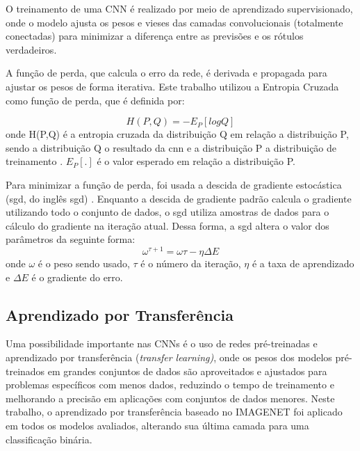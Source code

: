 O treinamento de uma CNN é realizado por meio de aprendizado supervisionado, onde o modelo ajusta os pesos e vieses das camadas convolucionais (totalmente conectadas) para minimizar a diferença entre as previsões e os rótulos verdadeiros.

A função de perda, que calcula o erro da rede, é derivada e propagada para ajustar os pesos de forma iterativa. 
Este trabalho utilizou a Entropia Cruzada como função de perda, que é definida por:

\begin{equation}
    \label{eqn:crossentropy}
    H(P,Q) = -E_{P}[log Q]
\end{equation}
onde H(P,Q) é a entropia cruzada da distribuição Q em relação a distribuição P, sendo a distribuição Q o resultado da \acrshort{cnn} e a distribuição P a distribuição de treinamento \cite{mao2023}. 
$E_{P}[.]$ é o valor esperado em relação a distribuição P.

Para minimizar a função de perda, foi usada a descida de gradiente estocástica (\acrshort{sgd}, do inglês \acrlong{sgd}) \cite{ruder2016}. Enquanto a descida de gradiente padrão calcula o gradiente utilizando todo o conjunto de dados, o \acrshort{sgd} utiliza amostras de dados para o cálculo do gradiente na iteração atual.
Dessa forma, a \acrshort{sgd} altera o valor dos parâmetros da seguinte forma:
\begin{equation}
    \label{eqn:sgd}
    \omega^{\tau+1} = \omega{\tau} - \eta\Delta{E}
\end{equation}
onde $\omega$ é o peso sendo usado, $\tau$ é o número da iteração, $\eta$ é a taxa de aprendizado e $\Delta{E}$ é o gradiente do erro.

\subsection{Aprendizado por Transferência}

Uma possibilidade importante nas CNNs é o uso de redes pré-treinadas e aprendizado por transferência (\textit{transfer learning)}, 
onde os pesos dos modelos pré-treinados em grandes conjuntos de dados são aproveitados e ajustados para problemas específicos com menos dados, 
reduzindo o tempo de treinamento e melhorando a precisão em aplicações com conjuntos de dados menores. 
Neste trabalho, o aprendizado por transferência baseado no IMAGENET \cite{deng2009imagenet} foi aplicado em todos os modelos avaliados, alterando sua última camada para uma classificação binária.

